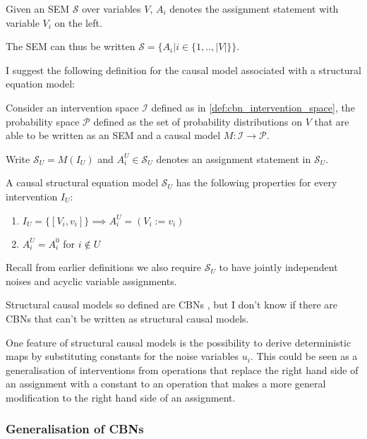\begin{definition}
Given an SEM $\mathcal{S}$ over variables $V$, $A_i$ denotes the assignment statement with variable $V_i$ on the left.

The SEM can thus be written $\mathcal{S}=\{A_i|i\in\{1,..,|V|\}\}$.
\end{definition}

I suggest the following definition for the causal model associated with a structural equation model:

\begin{definition}
Consider an intervention space $\mathcal{I}$ defined as in \ref{def:cbn_intervention_space}, the probability space $\mathcal{P}$ defined as the set of probability distributions on $V$ that are able to be written as an SEM and a causal model $M:\mathcal{I}\to\mathcal{P}$.

Write $\mathcal{S}_U=M(I_U)$ and $A_i^U\in\mathcal{S}_U$ denotes an assignment statement in $\mathcal{S}_U$.

A causal structural equation model $\mathcal{S}_U$ has the following properties for every intervention $I_U$:
\begin{enumerate}
    \item $I_U=\{[V_i,v_i]\}\implies A_i^U=(V_i:=v_i)$
    \item $A_i^U=A_i^0$ for $i\not\in U$
\end{enumerate}
Recall from earlier definitions we also require $\mathcal{S}_U$ to have jointly independent noises and acyclic variable assignments.

\end{definition}

Structural causal models so defined are CBNs \cite{pearl_causality:_2009}, but I don't know if there are CBNs that can't be written as structural causal models.

One feature of structural causal models is the possibility to derive deterministic maps by substituting constants for the noise variables $u_i$. This could be seen as a generalisation of interventions from operations that replace the right hand side of an assignment with a constant to an operation that makes a more general modification to the right hand side of an assignment.


\subsubsection*{Generalisation of CBNs}

